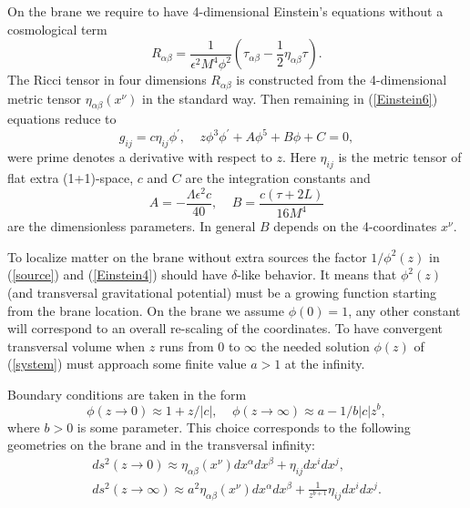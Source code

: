\documentclass[a4paper,a4paper]{article}
\begin{document}
On the brane we require to have 4-dimensional Einstein's equations
without a cosmological term
\begin{equation} \label{Einstein4}
R_{\alpha\beta} = \frac{1}{\epsilon^2 M^4\phi^2 }\left( \tau
_{\alpha\beta} - \frac{1}{2}\eta_{\alpha\beta}\tau\right).
\end{equation}
The Ricci tensor in four dimensions $R_{\alpha\beta}$ is
constructed from the 4-dimensional metric tensor
$\eta_{\alpha\beta}(x^{\nu})$ in the standard way. Then remaining
in (\ref{Einstein6}) equations reduce to \cite{GoMi}
\begin{equation} \label{system}
g_{ij} = c\eta _{ij}\phi^{'} , ~~~~~ z\phi^3 \phi^{'} + A\phi^5 +
B\phi + C = 0 ,
\end{equation}
were prime denotes a derivative with respect to $z$. Here $\eta _{ij}$
is the metric tensor of flat extra (1+1)-space, $c$ and $C$ are
the integration constants and
\begin{equation} \label{parameters}
A = - \frac{\Lambda \epsilon^2 c}{40},~~~~~ B = \frac{c(\tau +
2L)}{16 M^4}
\end{equation}
are the dimensionless parameters. In general $B$ depends on the
4-coordinates $x^\nu$.

To localize matter on the brane without extra sources the factor
$1/\phi ^2(z)$ in (\ref{source}) and (\ref{Einstein4}) should have
$\delta$-like behavior. It means that $\phi^2(z)$ (and transversal
gravitational potential) must be a growing function starting from
the brane location. On the brane we assume $\phi (0) = 1$, any
other constant will correspond to an overall re-scaling of the
coordinates. To have convergent transversal volume when $z$ runs
from $0$ to $\infty$ the needed solution $\phi(z)$ of
(\ref{system}) must approach some finite value $a > 1$ at the
infinity.

Boundary conditions are taken in the form
\begin{equation} \label{asimptotics}
\phi (z \rightarrow 0) \approx 1 + z/|c|,~~~~~\phi (z \rightarrow
\infty)\approx a - 1/b |c| z^b ,
\end{equation}
where $b > 0$ is some parameter. This choice corresponds to the
following geometries on the brane and in the transversal infinity:
\begin{eqnarray} \label{geometry}
ds^2(z \rightarrow 0) \approx \eta_{\alpha \beta }(x^\nu)dx^\alpha
dx^\beta + \eta_{ij}dx^i dx^j, \nonumber \\
ds^2 (z \rightarrow \infty)
\approx a^2 \eta_{\alpha \beta }(x^\nu)dx^\alpha dx^\beta +
\frac{1}{z^{b + 1}}\eta_{ij}dx^i dx^j.
\end{eqnarray}
\end{document}
